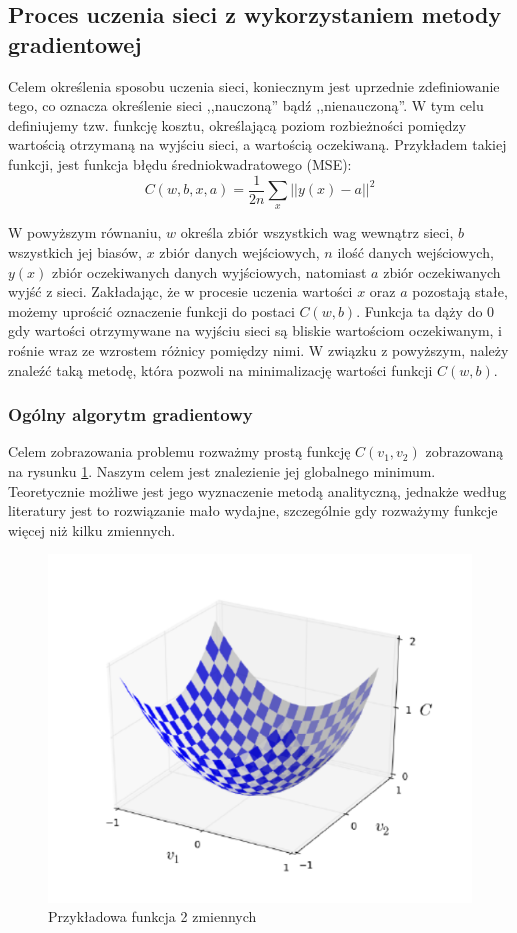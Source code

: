 \documentclass[12pt,twoside]{article}
\begin{document}
\subsection{Proces uczenia sieci z wykorzystaniem metody gradientowej}
Celem określenia sposobu uczenia sieci, koniecznym jest uprzednie zdefiniowanie tego, co oznacza określenie sieci ,,nauczoną'' bądź ,,nienauczoną''.
W tym celu definiujemy tzw. funkcję kosztu, określającą poziom rozbieżności pomiędzy wartością otrzymaną na wyjściu sieci, a wartością oczekiwaną.
Przykładem takiej funkcji, jest funkcja błędu średniokwadratowego (MSE):
\begin{equation}
	\label{eq:costFunction}
	C\left( w, b, x, a\right) = \frac{1}{2n} \sum\limits_{x} || y\left( x \right) - a ||^2
\end{equation}

W powyższym równaniu, $w$ określa zbiór wszystkich wag wewnątrz sieci, $b$ wszystkich jej biasów, $x$ zbiór danych wejściowych, $n$ ilość danych wejściowych, $y(x)$ zbiór oczekiwanych danych wyjściowych, natomiast $a$ zbiór oczekiwanych wyjść z sieci.
Zakładając, że w procesie uczenia wartości $x$ oraz $a$ pozostają stałe, możemy uprościć oznaczenie funkcji do postaci $C (w,b)$.
Funkcja ta dąży do 0 gdy wartości otrzymywane na wyjściu sieci są bliskie wartościom oczekiwanym, i rośnie wraz ze wzrostem różnicy pomiędzy nimi.
W związku z powyższym, należy znaleźć taką metodę, która pozwoli na minimalizację wartości funkcji $C(w,b)$.

\subsubsection{Ogólny algorytm gradientowy}
Celem zobrazowania problemu rozważmy prostą funkcję $C(v_1, v_2)$ zobrazowaną na rysunku \ref{Fig:simpleCost}.
Naszym celem jest znalezienie jej globalnego minimum.
Teoretycznie możliwe jest jego wyznaczenie metodą analityczną, jednakże według literatury \cite{nndl} jest to rozwiązanie mało wydajne, szczególnie gdy rozważymy funkcje więcej niż kilku zmiennych.

\begin{figure}[ht]
	\centering
	\includegraphics[width=12cm]{figures/models/gradientExample.png}
	\caption{Przykładowa funkcja 2 zmiennych}
	\label{Fig:simpleCost}
\end{figure}
\end{document}
